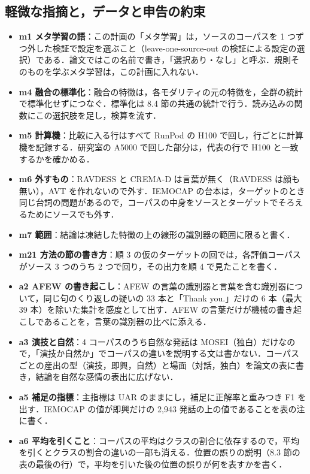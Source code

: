 \documentclass[11pt,a4paper]{ltjsarticle}
\begin{document}
\subsection{軽微な指摘と，データと申告の約束}

\begin{itemize}
  \item \textbf{m1 メタ学習の語}：この計画の「メタ学習」は，ソースのコーパスを 1 つずつ外した検証で設定を選ぶこと（leave-one-source-out の検証による設定の選択）である．論文ではこの名前で書き，「選択あり・なし」と呼ぶ．規則そのものを学ぶメタ学習は，この計画に入れない．
  \item \textbf{m4 融合の標準化}：融合の特徴は，各モダリティの元の特徴を，全群の統計で標準化せずにつなぐ．標準化は 8.4 節の共通の統計で行う．読み込みの関数にこの選択肢を足し，検算を流す．
  \item \textbf{m5 計算機}：比較に入る行はすべて RunPod の H100 で回し，行ごとに計算機を記録する．研究室の A5000 で回した部分は，代表の行で H100 と一致するかを確かめる．
  \item \textbf{m6 外すもの}：RAVDESS と CREMA-D は言葉が無く（RAVDESS は顔も無い），AVT を作れないので外す．IEMOCAP の台本は，ターゲットのとき同じ台詞の問題があるので，コーパスの中身をソースとターゲットでそろえるためにソースでも外す．
  \item \textbf{m7 範囲}：結論は凍結した特徴の上の線形の識別器の範囲に限ると書く．
  \item \textbf{m21 方法の節の書き方}：順 3 の仮のターゲットの回では，各評価コーパスがソース 3 つのうち 2 つで回り，その出力を順 4 で見たことを書く．
  \item \textbf{a2 AFEW の書き起こし}：AFEW の言葉の識別器と言葉を含む識別器について，同じ句のくり返しの疑いの 33 本と「Thank you.」だけの 6 本（最大 39 本）を除いた集計を感度として出す．AFEW の言葉だけが機械の書き起こしであることを，言葉の識別器の比べに添える．
  \item \textbf{a3 演技と自然}：4 コーパスのうち自然な発話は MOSEI（独白）だけなので，「演技か自然か」でコーパスの違いを説明する文は書かない．コーパスごとの産出の型（演技，即興，自然）と場面（対話，独白）を論文の表に書き，結論を自然な感情の表出に広げない．
  \item \textbf{a5 補足の指標}：主指標は UAR のままにし，補足に正解率と重みつき F1 を出す．IEMOCAP の値が即興だけの 2,943 発話の上の値であることを表の注に書く．
  \item \textbf{a6 平均を引くこと}：コーパスの平均はクラスの割合に依存するので，平均を引くとクラスの割合の違いの一部も消える．位置の誤りの説明（8.3 節の表の最後の行）で，平均を引いた後の位置の誤りが何を表すかを書く．

\end{itemize}
\end{document}
